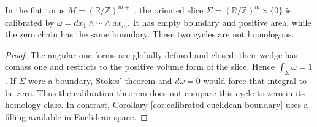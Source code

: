 \begin{example}\label{ex:calibration-homology-condition}
In the flat torus $M=(\mathbb R/\mathbb Z)^{m+1}$, the oriented slice $\Sigma=(\mathbb R/\mathbb Z)^m\times\{0\}$ is calibrated by $\omega=dx_1\wedge\cdots\wedge dx_m$. It has empty boundary and positive area, while the zero chain has the same boundary. These two cycles are not homologous.
\end{example}
\begin{proof}
The angular one-forms are globally defined and closed; their wedge has comass one and restricts to the positive volume form of the slice. Hence $\int_\Sigma\omega=1$. If $\Sigma$ were a boundary, Stokes' theorem and $d\omega=0$ would force that integral to be zero. Thus the calibration theorem does not compare this cycle to zero in its homology class. In contrast, Corollary \ref{cor:calibrated-euclidean-boundary} uses a filling available in Euclidean space.
\end{proof}
